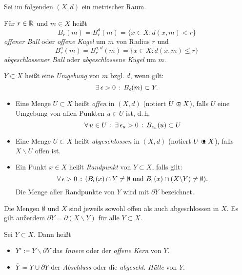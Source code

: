 \documentclass{cheat-sheet}
\begin{document}
\begin{nota}
Sei im folgenden $(X, d)$ ein metrischer Raum.
\end{nota}


\begin{defn}
  Für $r \in \mathbb{R}$ und $m \in X$ heißt
  \[ B_r(m) = B_r^d(m) = \{ x \in X : d(x, m) < r \} \]
  \emph{offener Ball} oder \emph{offene Kugel} um $m$ von Radius $r$ und
  \[ B_r^a(m) = B_r^{a,d}(m) = \{ x \in X : d(x, m) \le r \} \]
  \emph{abgeschlossener Ball} oder \emph{abgeschlossene Kugel} um $m$.
\end{defn}

\begin{defn}
  $Y \subset X$ heißt eine \emph{Umgebung} von $m$ bzgl. $d$, wenn gilt:
  \[ \exists \, {\epsilon > 0} \,:\, B_{\epsilon}(m) \subset Y. \]
\end{defn}

\begin{defn}
\begin{itemize}
  \item Eine Menge $U \subset X$ heißt \emph{offen} in $(X, d)$ (notiert $U \opn X$), falls $U$ eine Umgebung von allen Punkten $u \in U$ ist, d.\,h.
  \[ \forall \, {u \in U} \,:\, \exists \, {\epsilon_u > 0} \,:\, B_{\epsilon_u}(u) \subset U \]
  \item Eine Menge $U \subset X$ heißt \emph{abgeschlossen} in $(X, d)$ (notiert $U \cls X$), falls $X \backslash U$ offen ist.
  \item Ein Punkt $x \in X$ heißt \emph{Randpunkt} von $Y \subset X$, falls gilt:
  \[ \forall \, {\epsilon > 0} \,:\, ( B_{\epsilon}(x) \cap Y \not= \emptyset \text{ und } B_{\epsilon}(x) \cap (X \backslash Y) \not= \emptyset). \]
  Die Menge aller Randpunkte von $Y$ wird mit \emph{$\partial Y$} bezeichnet.
\end{itemize}
\end{defn}

\begin{bem}
Die Mengen $\emptyset$ und $X$ sind jeweils sowohl offen als auch abgeschlossen in $X$. Es gilt außerdem $\partial Y = \partial (X \backslash Y)$ für alle $Y \subset X$.
\end{bem}

\begin{defn}
Sei $Y \subset X$. Dann heißt
\begin{itemize}
  \item $Y^{\circ} \coloneqq Y \backslash \partial Y$ das \emph{Innere} oder der \emph{offene Kern} von $Y$.
  \item $\overline{Y} \coloneqq Y \cup \partial Y$ der \emph{Abschluss} oder die \emph{abgeschl. Hülle} von $Y$.
\end{itemize}
\end{defn}
\end{document}
